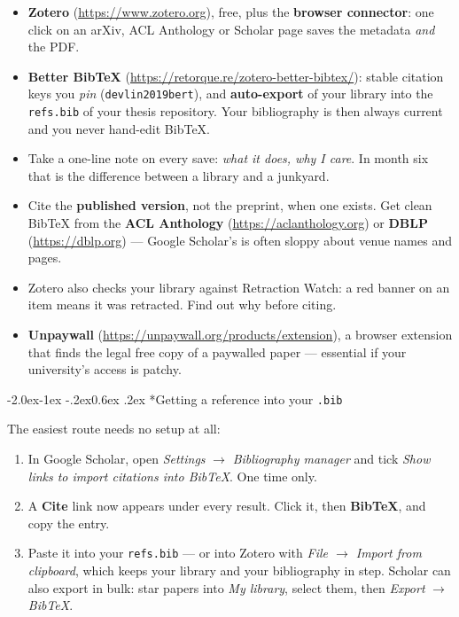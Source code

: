\documentclass[11pt,a4paper]{article}
\makeatletter
\renewcommand\subsubsection{\@startsection{subsubsection}{3}{\z@}%
  {-2.0ex\@plus -1ex \@minus -.2ex}{0.6ex \@plus .2ex}%
  {\normalfont\normalsize\bfseries\color{ink}}}
\newcommand{\code}[1]{\texttt{\small #1}}
\makeatother
\begin{document}
\begin{itemize}
  \item \textbf{Zotero} (\url{https://www.zotero.org}), free, plus the
        \textbf{browser connector}: one click on an arXiv, ACL Anthology or
        Scholar page saves the metadata \emph{and} the PDF.
  \item \textbf{Better BibTeX} (\url{https://retorque.re/zotero-better-bibtex/}):
        stable citation keys you \emph{pin} (\code{devlin2019bert}), and
        \textbf{auto-export} of your library into the \code{refs.bib} of your
        thesis repository. Your bibliography is then always current and you
        never hand-edit BibTeX.
  \item Take a one-line note on every save: \emph{what it does, why I care}.
        In month six that is the difference between a library and a junkyard.
  \item Cite the \textbf{published version}, not the preprint, when one exists.
        Get clean BibTeX from the \textbf{ACL Anthology}
        (\url{https://aclanthology.org}) or \textbf{DBLP}
        (\url{https://dblp.org}) --- Google Scholar's is often sloppy about
        venue names and pages.
  \item Zotero also checks your library against Retraction Watch: a red
        banner on an item means it was retracted. Find out why before citing.
  \item \textbf{Unpaywall} (\url{https://unpaywall.org/products/extension}),
        a browser extension that finds the legal free copy of a paywalled
        paper --- essential if your university's access is patchy.
\end{itemize}

\subsubsection*{Getting a reference into your \code{.bib}}

The easiest route needs no setup at all:

\begin{enumerate}
  \item In Google Scholar, open \emph{Settings} $\rightarrow$
        \emph{Bibliography manager} and tick \emph{Show links to import
        citations into BibTeX}. One time only.
  \item A \textbf{Cite} link now appears under every result. Click it, then
        \textbf{BibTeX}, and copy the entry.
  \item Paste it into your \code{refs.bib} --- or into Zotero with
        \emph{File $\rightarrow$ Import from clipboard}, which keeps your
        library and your bibliography in step. Scholar can also export in
        bulk: star papers into \emph{My library}, select them, then
        \emph{Export} $\rightarrow$ \emph{BibTeX}.
\end{enumerate}
\end{document}
